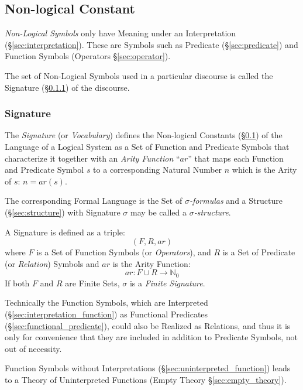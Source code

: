\subsection{Non-logical Constant}\label{sec:nonlogical_constant}

\emph{Non-Logical Symbols} only have Meaning under an Interpretation
(\S\ref{sec:interpretation}). These are Symbols such as Predicate
(\S\ref{sec:predicate}) and Function Symbols (Operators
\S\ref{sec:operator}).

The set of Non-Logical Symbols used in a particular discourse is
called the Signature (\S\ref{sec:signature}) of the discourse.



\subsubsection{Signature}\label{sec:signature}

The \emph{Signature} (or \emph{Vocabulary}) defines the Non-logical
Constants (\S\ref{sec:nonlogical_constant}) of the Language of a
Logical System as a Set of Function and Predicate Symbols that
characterize it together with an \emph{Arity Function} ``$ar$'' that
maps each Function and Predicate Symbol $s$ to a corresponding Natural
Number $n$ which is the Arity of $s$: $n = ar(s)$.

The corresponding Formal Language is the Set of
\emph{$\sigma$-formulas} and a Structure (\S\ref{sec:structure}) with
Signature $\sigma$ may be called a \emph{$\sigma$-structure}.

A Signature is defined as a triple:
\[
  (F,R,ar)
\]
where $F$ is a Set of Function Symbols (or \emph{Operators}), and $R$
is a Set of Predicate (or \emph{Relation}) Symbols and $ar$ is the
Arity Function:
\[
  ar: F \cup R \rightarrow \mathbb{N}_0
\]
If both $F$ and $R$ are Finite Sets, $\sigma$ is a \emph{Finite
  Signature}.

Technically the Function Symbols, which are Interpreted
(\S\ref{sec:interpretation_function}) as Functional Predicates
(\S\ref{sec:functional_predicate}), could also be Realized as
Relations, and thus it is only for convenience that they are included
in addition to Predicate Symbols, not out of necessity.

Function Symbols without Interpretations
(\S\ref{sec:uninterpreted_function}) leads to a Theory of
Uninterpreted Functions (Empty Theory \S\ref{sec:empty_theory}).

